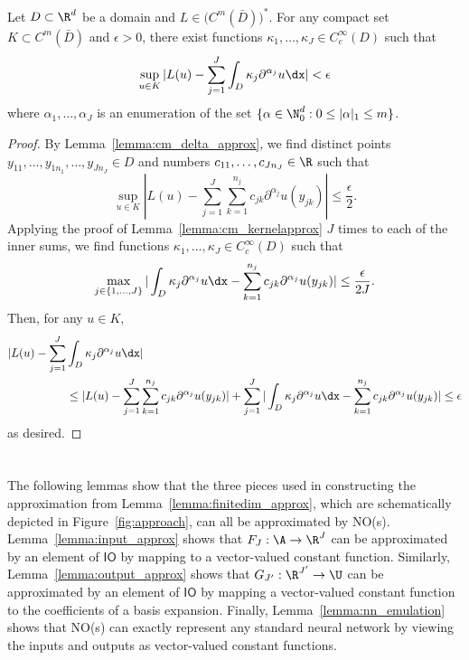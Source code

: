 \begin{lemma}
\label{lemma:cm_kernelapprox}
Let \(D \subset \R^d\) be a domain and \(L \in \bigl ( C^m (\bar{D}) \bigl)^*\). 
For any compact set \(K \subset C^m (\bar{D})\) and \(\epsilon > 0\),
there exist functions \(\kappa_1,\dots,\kappa_J \in C^\infty_c (D)\) such that
\[\sup_{u \in K} |L(u) - \sum_{j=1}^J \int_D \kappa_j  \partial^{\alpha_j} u \dx| < \epsilon\]
where \(\alpha_1,\dots,\alpha_J\) is an enumeration of the set \(\{\alpha \in \N^d_0 : 0 \leq |\alpha|_1 \leq m\}\).
\end{lemma}

\begin{proof}
By Lemma~\ref{lemma:cm_delta_approx}, we find distinct points \(y_{11},\dots,y_{1 n_1},\dots,y_{J n_J} \in D\) and numbers \(c_{11},\dots,c_{J n_J} \in \R\) such that
\[\sup_{u \in K} |L(u) - \sum_{j=1}^J \sum_{k=1}^{n_j} c_{j k} \partial^{\alpha_j} u(y_{jk})| \leq \frac{\epsilon}{2}.\]
Applying the proof of Lemma~\ref{lemma:cm_kernelapprox} \(J\) times to each of the inner sums, we find functions 
\(\kappa_1,\dots,\kappa_J \in C^\infty_c (D)\) such that
\[\max_{j \in \{1,\dots,J\}}|\int_D \kappa_j \partial^{\alpha_j} u \dx - \sum_{k=1}^{n_j} c_{jk} \partial^{\alpha_j} u(y_{jk}) | \leq \frac{\epsilon}{2J}.\]
Then, for any \(u \in K\),
\begin{align*}
|L(u) - \sum_{j=1}^J &\int_D \kappa_j  \partial^{\alpha_j} u \dx|\\& \leq |L(u) - \sum_{j=1}^J \sum_{k=1}^{n_j} c_{j k} \partial^{\alpha_j} u(y_{jk})| + \sum_{j=1}^J  |\int_D \kappa_j \partial^{\alpha_j} u \dx - \sum_{k=1}^{n_j} c_{jk} \partial^{\alpha_j} u(y_{jk})| \leq \epsilon
\end{align*}
as desired.
\end{proof}

\section{}
\label{sec:appendix_nos}

The following lemmas show that the three pieces used in constructing the approximation from Lemma~\ref{lemma:finitedim_approx}, which are schematically depicted in Figure~\ref{fig:approach}, can all be approximated by NO(s). Lemma~\ref{lemma:input_approx} shows that \(F_J : \A \to \R^{J}\) can be approximated by an element of \(\mathsf{IO}\) by mapping to a vector-valued constant function. Similarly, Lemma~\ref{lemma:output_approx} shows that \(G_{J'} : \R^{J'} \to \U\) can be approximated by an element of \(\mathsf{IO}\) by mapping a vector-valued constant function to the coefficients of a basis expansion. Finally, Lemma~\ref{lemma:nn_emulation} shows that NO(s) can exactly represent any standard neural network by viewing the inputs and outputs as vector-valued constant functions.

